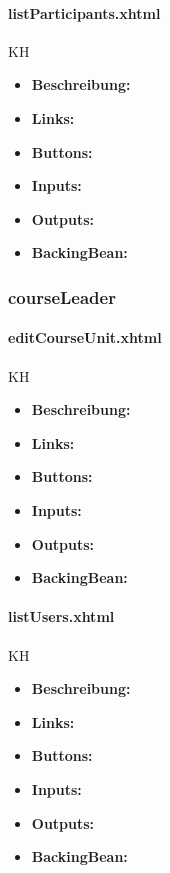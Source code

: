 				\paragraph{listParticipants.xhtml}
					KH\\
					\begin{itemize}
						\item \textbf{Beschreibung:}
						\item \textbf{Links:}
						\item \textbf{Buttons:}
						\item \textbf{Inputs:}
						\item \textbf{Outputs:}
						\item \textbf{BackingBean:}
					\end{itemize}
			
			\subsubsection{courseLeader}
			
				\paragraph{editCourseUnit.xhtml}
					KH\\
					\begin{itemize}
						\item \textbf{Beschreibung:}
						\item \textbf{Links:}
						\item \textbf{Buttons:}
						\item \textbf{Inputs:}
						\item \textbf{Outputs:}
						\item \textbf{BackingBean:}
					\end{itemize}
				
				\paragraph{listUsers.xhtml}
					KH\\
					\begin{itemize}
						\item \textbf{Beschreibung:}
						\item \textbf{Links:}
						\item \textbf{Buttons:}
						\item \textbf{Inputs:}
						\item \textbf{Outputs:}
						\item \textbf{BackingBean:}
					\end{itemize}
			
